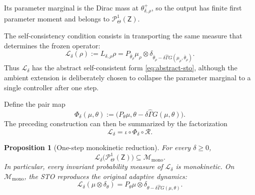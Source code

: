 \documentclass[11pt]{article}
\newtheorem{proposition}[theorem]{Proposition}
\theoremstyle{definition}
\theoremstyle{remark}
\newcommand{\ProbThetaOne}{\mathcal{P}_{\Theta}^{1}}
\newcommand{\STO}{\mathcal{L}}
\newcommand{\Lin}{L}
\newcommand{\Gammahat}{\widehat{\Gamma}}
\newcommand{\Z}{\mathsf{Z}}
\newcommand{\Mmono}{\mathscr{M}_{\mathrm{mono}}}
\begin{document}
Its parameter marginal is the Dirac mass at
$\theta_{\delta,\rho}^{+}$, so the output has finite first
parameter moment and belongs to $\ProbThetaOne(\Z)$.


The self-consistency condition consists in transporting the same measure that
determines the frozen operator:
\begin{equation}
  \boxed{
  \STO_\delta(\rho)
  :=\Lin_{\delta,\rho}\rho
  =P_{\bar\theta_\rho}\mu_\rho
   \otimes
   \delta_{\bar\theta_\rho-
   \delta\Gammahat G(\mu_\rho,\bar\theta_\rho)}.}
  \label{eq:extended-sto}
\end{equation}
Thus \(\STO_\delta\) has the abstract self-consistent form
\eqref{eq:abstract-sto}, although the ambient extension is deliberately chosen
to collapse the parameter marginal to a single controller after one step.

Define the pair map
\begin{equation}
  \Phi_\delta(\mu,\theta)
  :=\bigl(P_\theta\mu,
          \theta-\delta\Gammahat G(\mu,\theta)\bigr).
  \label{eq:pair-map}
\end{equation}
The preceding construction can then be summarized by the factorization
\begin{equation}
  \boxed{
  \STO_\delta
  =\iota\circ\Phi_\delta\circ\mathcal R.}
  \label{eq:sto-factorization}
\end{equation}

\begin{proposition}[One-step monokinetic reduction]
\label{prop:one-step-monokinetic}
For every \(\delta\geq0\),
\begin{equation}
  \boxed{
  \STO_\delta\bigl(\ProbThetaOne(\Z)\bigr)\subseteq\Mmono.}
  \label{eq:one-step-monokinetic}
\end{equation}
In particular, every invariant probability measure of \(\STO_\delta\) is
monokinetic.  On \(\Mmono\), the STO reproduces the original adaptive dynamics:
\begin{equation}
  \STO_\delta(\mu\otimes\delta_\theta)
  =P_\theta\mu\otimes
   \delta_{\theta-\delta\Gammahat G(\mu,\theta)}.
  \label{eq:monokinetic-action}
\end{equation}
\end{proposition}

\end{document}
